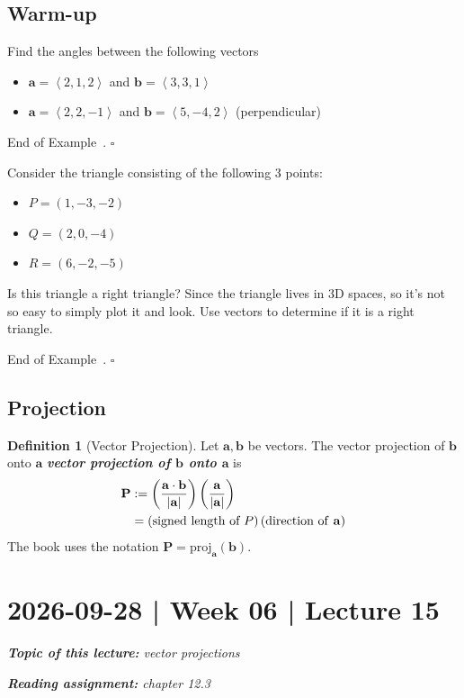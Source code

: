 \documentclass[10pt]{article}
\DeclareRobustCommand{\demph}[1]{%
  \ifmmode
  {\color{Blue}#1}%
  \else
  {\color{Blue}\bfseries\slshape #1}%
  \fi
}
\theoremstyle{definition}
\newtheorem{definition}[theorem]{Definition}
\newtheorem{example}[theorem]{Example}
\renewenvironment{example}
{\begin{oldexample}}
  {\par\smallskip\hfill   End of Example~\theexample. $\square$    \par\end{oldexample}}
\newcommand{\1}[1]{\textbf{1}_{\left[#1\right]}} %
\begin{document}
\subsection{Warm-up}

\begin{example}
  Find the angles between the following vectors
  \begin{itemize}
    \item $\mathbf{a} = \left\langle 2,1,2 \right\rangle $ and $\mathbf{b}=\left\langle 3,3,1 \right\rangle $ 
    \item $\mathbf{a} = \left\langle 2,2,-1 \right\rangle $ and $\mathbf{b}=\left\langle 5,-4,2 \right\rangle $ (perpendicular)
  \end{itemize}
\end{example}


\begin{example}
  Consider the triangle consisting of the following 3 points:
  \begin{itemize}
    \item $P = \left( 1,-3,-2 \right) $
    \item $Q = \left( 2,0,-4 \right) $
    \item $R = \left( 6, -2, -5 \right) $
  \end{itemize}
  Is this triangle a right triangle? Since the triangle lives in 3D spaces, so it's not so easy to simply
  plot it and look. Use vectors to determine if it is a right triangle.
\end{example}
\subsection{Projection}
\begin{definition}[Vector Projection]
  \label{def:vector-projection}
  Let $\mathbf{a},\mathbf{b}$ be vectors. The \demph{vector projection of $\mathbf{b}$ onto $\mathbf{a}$} is
  \begin{align*}
    \mathbf{P}
    &:= \left( \frac{\mathbf{a}\cdot \mathbf{b}}{|\mathbf{a}|} \right) \left(\frac{\mathbf{a}}{|\mathbf{a}|}\right)\\
    &= \left( \text{signed length of }P \right)\left( \text{direction of \textbf{a}} \right) \nonumber
  \end{align*}
  The book uses the notation $\mathbf{P} = \text{proj}_{\mathbf{a}}(\mathbf{b})$.
\end{definition}

\newpage
\section{2026-09-28 | Week 06 | Lecture 15}
\begin{center}
  \begin{tcolorbox}[width=0.9\textwidth, colback=white, colframe=black]
    \textit{\textbf{Topic of this lecture:} vector projections}

    \textit{\textbf{Reading assignment:} chapter 12.3}
  \end{tcolorbox}
\end{center}
\end{document}
